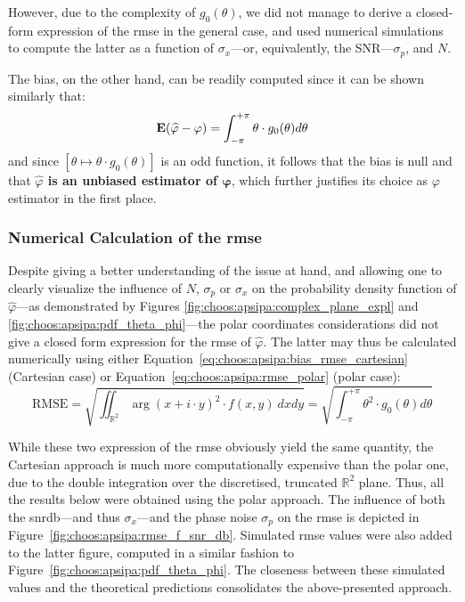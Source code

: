 However, due to the complexity of $g_0(\theta)$, we did not manage to derive a closed-form expression of the \gls{rmse} in the general case, and used numerical simulations to compute the latter as a function of $\sigma_x$---or, equivalently, the SNR---$\sigma_p$, and $N$.

The bias, on the other hand, can be readily computed since it can be shown similarly that:
\begin{equation}
	\mathbf{E}{(\widehat{\varphi} - \varphi)} = \int_{-\pi}^{+ \pi} \theta \cdot g_0(\theta) d\theta
\end{equation}
and since $\left[\theta \mapsto \theta \cdot g_0(\theta)\right]$ is an odd function, it follows that the bias is null and that \textbf{$\widehat{\varphi}$ is an unbiased estimator of $\bm{\varphi}$}, which further justifies its choice as $\varphi$ estimator in the first place.

\subsubsection{Numerical Calculation of the \texorpdfstring{\gls{rmse}}{RMSE}}\label{sect:choos:apsipa:num_results}

Despite giving a better understanding of the issue at hand, and allowing one to clearly visualize the influence of $N$, $\sigma_p$ or $\sigma_x$ on the probability density function of $\widehat{\varphi}$---as demonstrated by Figures \ref{fig:choos:apsipa:complex_plane_expl} and \ref{fig:choos:apsipa:pdf_theta_phi}---the polar coordinates considerations did not give a closed form expression for the \gls{rmse} of $\widehat{\varphi}$. The latter may thus be calculated numerically using either Equation~\ref{eq:choos:apsipa:bias_rmse_cartesian} (Cartesian case) or Equation~\ref{eq:choos:apsipa:rmse_polar} (polar case):
\begin{equation}
	\text{RMSE} = \sqrt{\iint_{\mathbb{R}^2} \arg\left(x + i \cdot y\right)^{2}\cdot f(x,y)\ dxdy} = \sqrt{\int_{-\pi}^{+\pi} \theta^2 \cdot g_0(\theta) d\theta}
\end{equation}

While these two expression of the \gls{rmse} obviously yield the same quantity, the Cartesian approach is much more computationally expensive than the polar one, due to the double integration over the discretised, truncated $\mathbb{R}^2$ plane. Thus, all the results below were obtained using the polar approach. The influence of both the \gls{snrdb}---and thus $\sigma_x$---and the phase noise $\sigma_p$ on the \gls{rmse} is depicted in Figure~\ref{fig:choos:apsipa:rmse_f_snr_db}. Simulated \gls{rmse} values were also added to the latter figure, computed in a similar fashion to Figure~\ref{fig:choos:apsipa:pdf_theta_phi}. The closeness between these simulated values and the theoretical predictions consolidates the above-presented approach.

